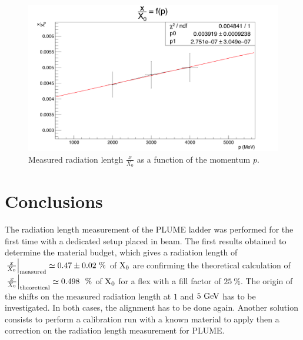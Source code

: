    \begin{figure}
     \centering
     \includegraphics[width =\textwidth]{Pictures/X0/radiationLength_2-4GeV.png}
     \caption{Measured radiation lentgh $\frac{x}{X_0}$ as a function of the momentum $p$.}
     \label{fig:X0vsP}
   \end{figure}

  \section{Conclusions}

  The radiation length measurement of the \gls{PLUME} ladder was performed for the first time with a dedicated setup placed in beam.
  The first results obtained to determine the material budget, which gives a radiation length of $\left. \frac{x}{X_0} \right|_{\rm{measured}} \simeq 0.47 \pm 0.02~\%$ of $\rm{X_0}$ are confirming the theoretical calculation of $\left. \frac{x}{X_0}\right|_{\rm{theoretical}} \simeq 0.498~~\%$ of $\rm{X_0}$ for a flex with a fill factor of $25~\%$.
  The origin of the shifts on the measured radiation length at $1$ and $5~\rm{GeV}$ has to be investigated.
  In both cases, the alignment has to be done again.
  Another solution consists to perform a calibration run with a known material to apply then a correction on the radiation length measurement for \gls{PLUME}.

